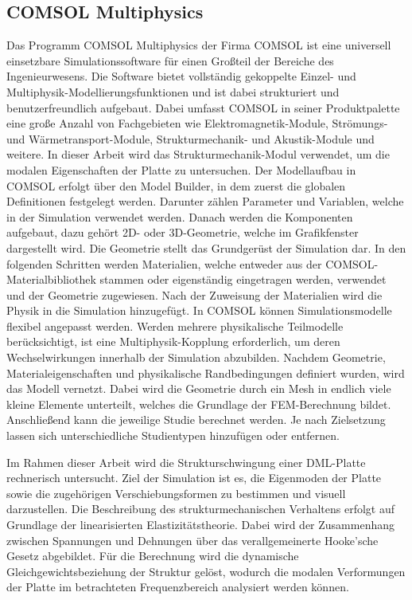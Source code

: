 \subsection{COMSOL Multiphysics}

Das Programm COMSOL Multiphysics der Firma COMSOL ist eine universell einsetzbare Simulationssoftware für einen Großteil der Bereiche des Ingenieurwesens. Die Software bietet vollständig gekoppelte Einzel- und Multiphysik-Modellierungsfunktionen und ist dabei strukturiert und benutzerfreundlich aufgebaut. Dabei umfasst COMSOL in seiner Produktpalette eine große Anzahl von Fachgebieten wie Elektromagnetik-Module, Strömungs- und Wärmetransport-Module, Strukturmechanik- und Akustik-Module und weitere. In dieser Arbeit wird das Strukturmechanik-Modul verwendet, um die modalen Eigenschaften der Platte zu untersuchen. Der Modellaufbau in COMSOL erfolgt über den Model Builder, in dem zuerst die globalen Definitionen festgelegt werden. Darunter zählen Parameter und Variablen, welche in der Simulation verwendet werden. Danach werden die Komponenten aufgebaut, dazu gehört 2D- oder 3D-Geometrie, welche im Grafikfenster dargestellt wird. Die Geometrie stellt das Grundgerüst der Simulation dar. In den folgenden Schritten werden Materialien, welche entweder aus der COMSOL-Materialbibliothek stammen oder eigenständig eingetragen werden, verwendet und der Geometrie zugewiesen. Nach der Zuweisung der Materialien wird die Physik in die Simulation hinzugefügt. In COMSOL können Simulationsmodelle flexibel angepasst werden. Werden mehrere physikalische Teilmodelle berücksichtigt, ist eine Multiphysik-Kopplung erforderlich, um deren Wechselwirkungen innerhalb der Simulation abzubilden. Nachdem Geometrie, Materialeigenschaften und physikalische Randbedingungen definiert wurden, wird das Modell vernetzt. Dabei wird die Geometrie durch ein Mesh in endlich viele kleine Elemente unterteilt, welches die Grundlage der FEM-Berechnung bildet. Anschließend kann die jeweilige Studie berechnet werden. Je nach Zielsetzung lassen sich unterschiedliche Studientypen hinzufügen oder entfernen.

Im Rahmen dieser Arbeit wird die Strukturschwingung einer DML-Platte rechnerisch untersucht. Ziel der Simulation ist es, die Eigenmoden der Platte sowie die zugehörigen Verschiebungsformen zu bestimmen und visuell darzustellen. Die Beschreibung des strukturmechanischen Verhaltens erfolgt auf Grundlage der linearisierten Elastizitätstheorie. Dabei wird der Zusammenhang zwischen Spannungen und Dehnungen über das verallgemeinerte Hooke’sche Gesetz abgebildet. Für die Berechnung wird die dynamische Gleichgewichtsbeziehung der Struktur gelöst, wodurch die modalen Verformungen der Platte im betrachteten Frequenzbereich analysiert werden können.



